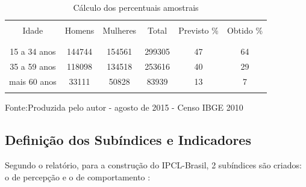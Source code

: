 \documentclass[
	12pt,				%
	openright,			%
	twoside,			%
	a4paper,			%
	chapter=TITLE,		%
	section=TITLE,		%
	subsection=TITLE,	%
	subsubsection=TITLE,%
	spanish,            %
	english,			%
	brazil				%
	]{abntex2}
\begin{document}
\begin{table}[!htpb]
	\begin{center}
		\caption{Cálculo dos percentuais amostrais}%
		\label{Tabela 1}
		\begin{tabular}{cccccc}
			\hline\\
			Idade & Homens & Mulheres & Total & Previsto \% & Obtido \% \\\\
			\hline
			\hline\\
			15 a 34 anos & 144744 & 154561 & 299305 & 47 & 64 \\
			35 a 59 anos & 118098 & 134518 & 253616 & 40 & 29\\
			mais 60 anos & 33111  & 50828  & 83939  & 13 & 7 \\\\
			\hline
		\end{tabular}%
	\end{center}
	\ABNTEXchapterfont\small{Fonte:Produzida pelo autor - agosto de 2015 - Censo IBGE 2010}
\end{table}
\FloatBarrier
\par
\subsection{Definição dos Subíndices e Indicadores}

Segundo o relatório, para a construção do IPCL-Brasil, 2 subíndices são criados: o de percepção e o de comportamento :
\end{document}
